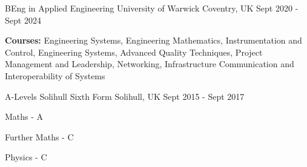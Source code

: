 

\begin{cventries}

  \cventry
    {BEng in Applied Engineering} %
    {University of Warwick} %
    {Coventry, UK} %
    {Sept 2020 - Sept 2024} %
    {
      \begin{cvitems} %
        \item {\textbf{Courses:} Engineering Systems, Engineering Mathematics, Instrumentation and Control, Engineering Systems, Advanced Quality Techniques, Project Management and Leadership, Networking, Infrastructure Communication and Interoperability of Systems}
      \end{cvitems}
    }

  \cventry
    {A-Levels} %
    {Solihull Sixth Form} %
    {Solihull, UK} %
    {Sept 2015 - Sept 2017} %
    {
      \begin{cvitems} %
        \item {Maths - A}
        \item {Further Maths - C}
        \item {Physics - C}
      \end{cvitems}
    }
\end{cventries}
